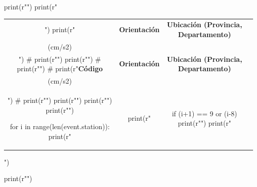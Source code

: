 \documentclass[11pt, a4paper]{report}
\begin{document}
\begin{pycode}

print(r"\renewcommand{\arraystretch}{1.2}")
print(r"\begin{longtable}{|c|c|c|c|}")
print(r"\caption{%
print(r"\hline")
print(r"\textbf{Código} & \textbf{Orientación} & \textbf{Ubicación (Provincia, Departamento)} & \textbf{\begin{tabular}[c]{@{}c@{}}PGA\\ (cm/s2)\end{tabular}} \\ \hline")
# print(r"\hline")
print(r"\endfirsthead")
# print(r"\hline")
# print(r"\textbf{Código} & \textbf{Orientación} & \textbf{Ubicación (Provincia, Departamento)} & \textbf{\begin{tabular}[c]{@{}c@{}}PGA\\ (cm/s2)\end{tabular}} \\ \hline")
# print(r"\hline")
print(r"\endhead")
print(r"\endfoot")
print(r"\endlastfoot")

for i in range(len(event.station)):
    print(r"\multirow{3}{*}{%
    print(r" & %
    print(r" & %
    if (i+1) == 9 or (i-8) %
        print(r"\pagebreak")
print(r"\end{longtable}")

print(r"\newpage")

\end{pycode}
\end{document}

